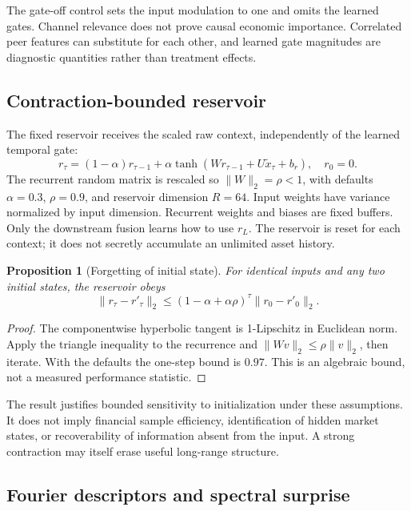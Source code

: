 \documentclass[11pt,a4paper]{article}
\newtheorem{proposition}{Proposition}
\begin{document}
The gate-off control sets the input modulation to one and omits the learned gates. Channel relevance does not prove causal economic importance. Correlated peer features can substitute for each other, and learned gate magnitudes are diagnostic quantities rather than treatment effects.

\subsection{Contraction-bounded reservoir}

The fixed reservoir receives the scaled raw context, independently of the learned temporal gate:
\begin{equation}
r_\tau=(1-\alpha)r_{\tau-1}+\alpha\tanh(Wr_{\tau-1}+U\widetilde x_\tau+b_r),\quad r_0=0.
\end{equation}
The recurrent random matrix is rescaled so $\|W\|_2=\rho<1$, with defaults $\alpha=0.3$, $\rho=0.9$, and reservoir dimension $R=64$. Input weights have variance normalized by input dimension. Recurrent weights and biases are fixed buffers. Only the downstream fusion learns how to use $r_L$. The reservoir is reset for each context; it does not secretly accumulate an unlimited asset history.

\begin{proposition}[Forgetting of initial state]
For identical inputs and any two initial states, the reservoir obeys
\[
\|r_\tau-r'_\tau\|_2\le(1-\alpha+\alpha\rho)^\tau\|r_0-r'_0\|_2.
\]
\end{proposition}
\begin{proof}
The componentwise hyperbolic tangent is 1-Lipschitz in Euclidean norm. Apply the triangle inequality to the recurrence and $\|Wv\|_2\le\rho\|v\|_2$, then iterate. With the defaults the one-step bound is $0.97$. This is an algebraic bound, not a measured performance statistic.
\end{proof}
The result justifies bounded sensitivity to initialization under these assumptions. It does not imply financial sample efficiency, identification of hidden market states, or recoverability of information absent from the input. A strong contraction may itself erase useful long-range structure.

\subsection{Fourier descriptors and spectral surprise}
\end{document}
